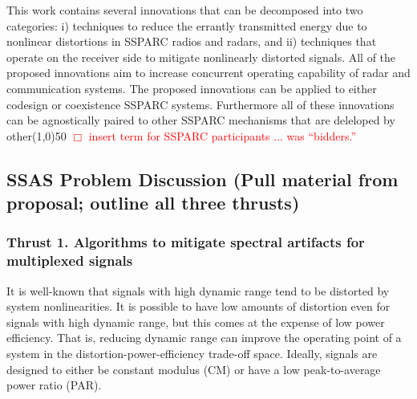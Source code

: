 \documentclass[11pt,onecolumn]{IEEEtran}
\begin{document}
This work contains several innovations that can be decomposed into two categories: i) techniques to reduce the errantly transmitted energy due to nonlinear distortions in SSPARC radios and radars, and ii) techniques that operate on the receiver side to mitigate nonlinearly distorted signals.  All of the proposed innovations aim to increase concurrent operating capability of radar and communication systems.  The proposed innovations can be applied to either codesign or coexistence SSPARC systems.  Furthermore all of these innovations can be agnostically paired to other SSPARC mechanisms that are deleloped by other\line(1,0){50}  \textcolor{red}{$\Box$ insert term for SSPARC participants ... was ``bidders.''}
\subsection{SSAS Problem Discussion
 (Pull material from proposal; outline all three thrusts)}
\subsubsection{Thrust 1. Algorithms to mitigate spectral artifacts for multiplexed signals}
It is well-known that signals with high dynamic range tend to be distorted by system nonlinearities.  It is possible to have low amounts of distortion even for signals with high dynamic range, but this comes at the expense of low power efficiency.  That is, reducing dynamic range can improve the operating point of a system in the distortion-power-efficiency trade-off space. Ideally, signals are designed to either be constant modulus (CM) or have a low peak-to-average power ratio (PAR).
\end{document}
